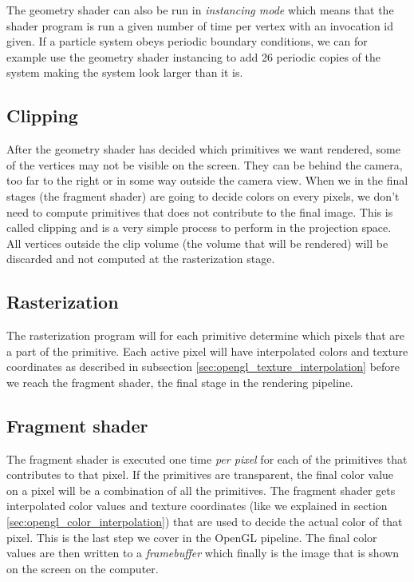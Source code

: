 The geometry shader can also be run in \textit{instancing mode} which means that the shader program is run a given number of time per vertex with an invocation id given. If a particle system obeys periodic boundary conditions, we can for example use the geometry shader instancing to add 26 periodic copies of the system making the system look larger than it is. 

\subsection{Clipping}
After the geometry shader has decided which primitives we want rendered, some of the vertices may not be visible on the screen. They can be behind the camera, too far to the right or in some way outside the camera view. When we in the final stages (the fragment shader) are going to decide colors on every pixels, we don't need to compute primitives that does not contribute to the final image. This is called clipping and is a very simple process to perform in the projection space. All vertices outside the clip volume (the volume that will be rendered) will be discarded and not computed at the rasterization stage.
\subsection{Rasterization}
The rasterization program will for each primitive determine which pixels that are a part of the primitive. Each active pixel will have interpolated colors and texture coordinates as described in subsection \ref{sec:opengl_texture_interpolation} before we reach the fragment shader, the final stage in the rendering pipeline.
\subsection{Fragment shader}
The fragment shader is executed one time \textit{per pixel} for each of the primitives that contributes to that pixel. If the primitives are transparent, the final color value on a pixel will be a combination of all the primitives. The fragment shader gets interpolated color values and texture coordinates (like we explained in section \ref{sec:opengl_color_interpolation}) that are used to decide the actual color of that pixel. This is the last step we cover in the OpenGL pipeline. The final color values are then written to a \textit{framebuffer} which finally is the image that is shown on the screen on the computer.